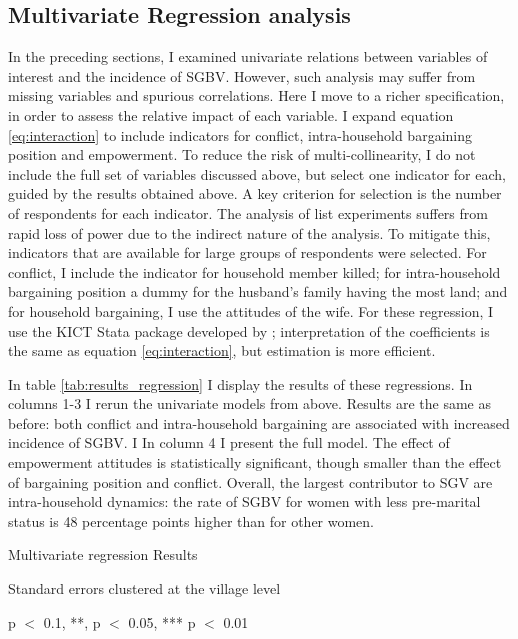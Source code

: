 \documentclass[10pt,a4paper]{scrartcl} %
\newcommand{\tableloc}{C:/Users/Koen/Dropbox/PhD/Papers/CongoGBV/Tables}
\begin{document}
\subsection*{Multivariate Regression analysis}
In the preceding sections, I examined univariate relations between variables of interest and the incidence of SGBV. However, such analysis may suffer from missing variables and spurious correlations. Here I move to a richer specification, in order to assess the relative impact of each variable. I expand equation \ref{eq:interaction} to include indicators for conflict, intra-household bargaining position and empowerment. To reduce the risk of multi-collinearity, I do not include the full set of variables discussed above, but select one indicator for each, guided by the results obtained above. A key criterion for selection is the number of respondents for each indicator. The analysis of list experiments suffers from rapid loss of power due to the indirect nature of the analysis. To mitigate this, indicators that are available for large groups of respondents were selected. For conflict, I include the indicator for household member killed; for intra-household bargaining position a dummy for the husband's family having the most land; and for household bargaining, I use the attitudes of the wife. For these regression, I use the KICT Stata package developed by \citet{Tsai2019}; interpretation of the coefficients is the same as equation \ref{eq:interaction}, but estimation is more efficient.

In table \ref{tab:results_regression} I display the results of these regressions. In columns 1-3 I rerun the univariate models from above. Results are the same as before: both conflict and intra-household bargaining are associated with increased incidence of SGBV. I In column 4 I present the full model. The effect of empowerment attitudes is statistically significant, though smaller than the effect of bargaining position and conflict. Overall, the largest contributor to SGV are intra-household dynamics: the rate of SGBV for women with less pre-marital status is 48 percentage points higher than for other women. 

\newcommand{\coeffget}[3]{\csvreader[filter=\equal{\reg}{#1} \and \equal{\var}{#2}]{\tableloc/regs.csv}{var=\var,reg=\reg,#3=\coeff}{\coeff}}

\begin{threeparttable}
	\caption{Multivariate regression Results}\label{tab:results_regression}
	\begin{center}
	
	
	\begin{tablenotes}
	\small
	 \item Standard errors clustered at the village level
	 \item * p $<$ 0.1, **, p $<$ 0.05, *** p $<$ 0.01
	\end{tablenotes}
	\end{center}
\end{threeparttable}
\end{document}
